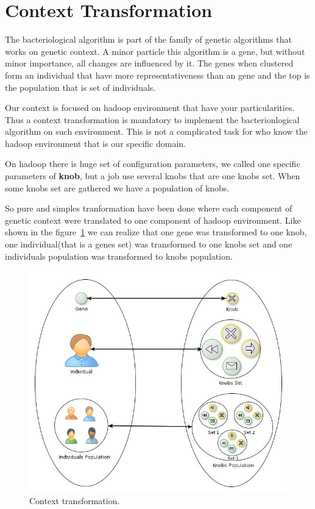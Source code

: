 \section{Context Transformation}

The bacteriological algorithm is part of the family of genetic algorithms that
works on genetic context. A minor particle this algorithm is a gene, but without
minor importance, all changes are influenced by it. The genes when clustered form
an individual that have more representativeness than an gene and the top is the
population that is set of individuals.

Our context is focused on hadoop environment that have your particularities. Thus
a context transformation is mandatory to implement the bacterionlogical algorithm
on such environment. This is not a complicated task for who know the hadoop
environment that is our specific domain.

On hadoop there is huge set of configuration parameters, we called one specific 
parameters of \textbf{knob}, but a job use several knobs that are one knobs set. 
When some knobs set are gathered we have a population of knobs.

So pure and simples tranformation have been done where each component of genetic
context were translated to one component of hadoop environment. Like shown in the
figure~\ref{fig:transformation} we can realize that one gene was transformed to one knob,
one individual(that is a genes set) was transformed to one knobs set and one individuals
population was transformed to knobs population.

\begin{figure}[htbp]
        \centering
        \includegraphics[width=\columnwidth]{img/transformation.jpg}
        \caption{Context transformation.}\label{fig:transformation}
\end{figure}

